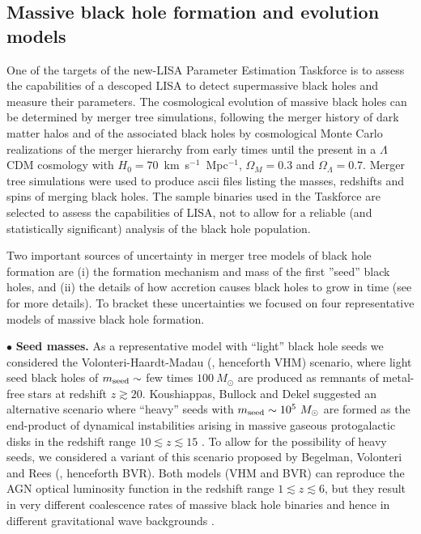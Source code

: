 \documentclass{iopart}
\begin{document}
\subsection{Massive black hole formation and evolution models}

One of the targets of the new-LISA Parameter Estimation Taskforce 
is to assess the capabilities of a descoped LISA to detect supermassive 
black holes and measure their
parameters. The cosmological evolution of massive black holes can be
determined by merger tree simulations, following the merger history of dark
matter halos and of the associated black holes by cosmological Monte Carlo
realizations of the merger hierarchy from early times until the present in a
$\Lambda$CDM cosmology with $H_0=70$~km~s$^{-1}$~Mpc$^{-1}$, $\Omega_M=0.3$
and $\Omega_{\Lambda}=0.7$. Merger tree simulations were used to produce
ascii files listing the masses, redshifts and spins of merging black
holes. The sample binaries used in the Taskforce are selected to assess the
capabilities of LISA, not to allow for a reliable (and statistically
significant) analysis of the black hole population.

Two important sources of uncertainty in merger tree models of black hole
formation are (i) the formation mechanism and mass of the first ''seed'' black
holes, and (ii) the details of how accretion causes black holes to grow in
time (see \cite{Sesana:2007sh} for more details). To bracket these
uncertainties we focused on four representative models of massive black hole
formation.

$\bullet$  {\bf Seed masses.} As a representative model with ``light'' black hole seeds we considered the
Volonteri-Haardt-Madau (\cite{Volonteri:2002vz}, henceforth VHM) scenario,
where light seed black holes of $m_{\rm seed}\sim$ few times $100~M_\odot$ are
produced as remnants of metal-free stars at redshift $z\gtrsim 20$.
Koushiappas, Bullock and Dekel suggested an alternative scenario where
``heavy'' seeds with $m_{\rm seed}\sim 10^5~M_\odot$ are formed as the
end-product of dynamical instabilities arising in massive gaseous
protogalactic disks in the redshift range $10\lesssim z \lesssim 15$
\cite{Koushiappas:2003zn}. To allow for the possibility of heavy seeds, we
considered a variant of this scenario proposed by Begelman, Volonteri and Rees
(\cite{Begelman:2006db}, henceforth BVR).  Both models (VHM and BVR) can
reproduce the AGN optical luminosity function in the redshift range $1\lesssim
z\lesssim 6$, but they result in very different coalescence rates of massive
black hole binaries and
hence in different gravitational wave backgrounds \cite{Sesana:2007sh}.
\end{document}
